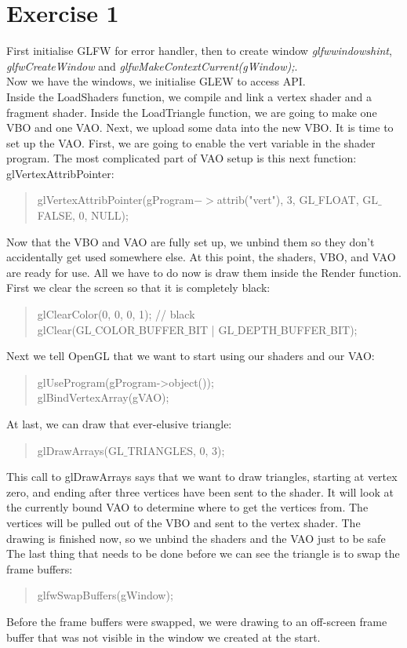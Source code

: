 \documentclass{article}
\begin{document}
\section{Exercise 1}
First initialise GLFW for error handler, then to create window \textit{glfwwindowshint}, \textit{glfwCreateWindow} and \textit{glfwMakeContextCurrent(gWindow);}.\\
Now we have the windows, we initialise GLEW to access API.\\
Inside the LoadShaders function, we compile and link a vertex shader and a fragment shader. Inside the LoadTriangle function, we are going to make one VBO and one VAO. Next, we upload some data into the new VBO. It is time to set up the VAO. First, we are going to enable the vert variable in the shader program. The most complicated part of VAO setup is this next function: glVertexAttribPointer:\\
\begin{quote}
glVertexAttribPointer(gProgram$->$attrib("vert"), 3, GL$\_$FLOAT, GL$\_$FALSE, 0, NULL);
\end{quote} 
Now that the VBO and VAO are fully set up, we unbind them so they don’t accidentally get used somewhere else. 
At this point, the shaders, VBO, and VAO are ready for use. All we have to do now is draw them inside the Render function.\\
First we clear the screen so that it is completely black:
\begin{quote}
glClearColor(0, 0, 0, 1); // black\\
glClear(GL$\_$COLOR$\_$BUFFER$\_$BIT | GL$\_$DEPTH$\_$BUFFER$\_$BIT);
\end{quote}
Next we tell OpenGL that we want to start using our shaders and our VAO:
\begin{quote}
glUseProgram(gProgram->object());\\
glBindVertexArray(gVAO);
\end{quote}
At last, we can draw that ever-elusive triangle:
\begin{quote}
glDrawArrays(GL$\_$TRIANGLES, 0, 3);
\end{quote}
This call to glDrawArrays says that we want to draw triangles, starting at vertex zero, and ending after three vertices have been sent to the shader. It will look at the currently bound VAO to determine where to get the vertices from. The vertices will be pulled out of the VBO and sent to the vertex shader. The drawing is finished now, so we unbind the shaders and the VAO just to be safe\\ 
The last thing that needs to be done before we can see the triangle is to swap the frame buffers:
\begin{quote}
glfwSwapBuffers(gWindow);
\end{quote}
Before the frame buffers were swapped, we were drawing to an off-screen frame buffer that was not visible in the window we created at the start.
\end{document}
